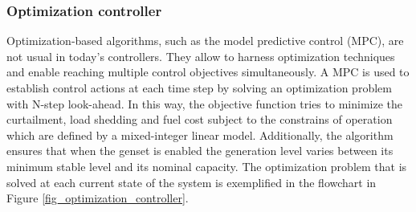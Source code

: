 \documentclass{ECOS_2019}
\begin{document}
\subsubsection{Optimization controller}
Optimization-based algorithms, such as the model predictive control (MPC), are not usual in today's controllers. They allow to harness optimization techniques and enable reaching multiple control objectives simultaneously. A MPC is used to establish control actions at each time step by solving an optimization problem with N-step look-ahead. In this way, the objective function tries to minimize the curtailment, load shedding and fuel cost subject to the constrains of operation which are defined by a mixed-integer linear model. Additionally, the algorithm ensures that when the genset is enabled the generation level varies between its minimum stable level and its nominal capacity\cite{Totaro2021}. The optimization problem that is solved at each current state of the system is exemplified in the flowchart in Figure \ref{fig_optimization_controller}.
\newpage
\end{document}

